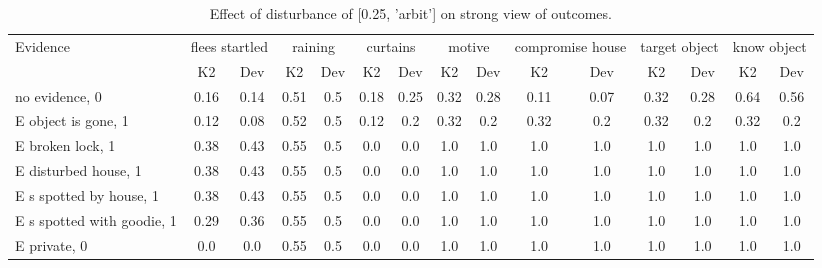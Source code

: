 \begin{table}\begin{tabular}{l|cc|cc|cc|cc|cc|cc|cc}\toprule\multirow{2}{*}{Evidence} & \multicolumn{2}{c}{flees startled}& \multicolumn{2}{c}{raining}& \multicolumn{2}{c}{curtains}& \multicolumn{2}{c}{motive}& \multicolumn{2}{c}{compromise house}& \multicolumn{2}{c}{target object}& \multicolumn{2}{c}{know object}\\& {K2} & {Dev}& {K2} & {Dev}& {K2} & {Dev}& {K2} & {Dev}& {K2} & {Dev}& {K2} & {Dev}& {K2} & {Dev}\\\midrule
no evidence, 0 & 0.16&0.14&0.51&0.5&\cellcolor{Bittersweet}0.18&\cellcolor{Bittersweet}0.25&0.32&0.28&0.11&0.07&0.32&0.28&\cellcolor{Bittersweet}0.64&\cellcolor{Bittersweet}0.56\\E object is gone, 1 & 0.12&0.08&0.52&0.5&\cellcolor{Bittersweet}0.12&\cellcolor{Bittersweet}0.2&\cellcolor{Bittersweet}0.32&\cellcolor{Bittersweet}0.2&\cellcolor{Bittersweet}0.32&\cellcolor{Bittersweet}0.2&\cellcolor{Bittersweet}0.32&\cellcolor{Bittersweet}0.2&\cellcolor{Bittersweet}0.32&\cellcolor{Bittersweet}0.2\\E broken lock, 1 & 0.38&0.43&\cellcolor{Bittersweet}0.55&\cellcolor{Bittersweet}0.5&0.0&0.0&1.0&1.0&1.0&1.0&1.0&1.0&1.0&1.0\\E disturbed house, 1 & 0.38&0.43&\cellcolor{Bittersweet}0.55&\cellcolor{Bittersweet}0.5&0.0&0.0&1.0&1.0&1.0&1.0&1.0&1.0&1.0&1.0\\E s spotted by house, 1 & 0.38&0.43&\cellcolor{Bittersweet}0.55&\cellcolor{Bittersweet}0.5&0.0&0.0&1.0&1.0&1.0&1.0&1.0&1.0&1.0&1.0\\E s spotted with goodie, 1 & \cellcolor{Bittersweet}0.29&\cellcolor{Bittersweet}0.36&\cellcolor{Bittersweet}0.55&\cellcolor{Bittersweet}0.5&0.0&0.0&1.0&1.0&1.0&1.0&1.0&1.0&1.0&1.0\\E private, 0 & 0.0&0.0&\cellcolor{Bittersweet}0.55&\cellcolor{Bittersweet}0.5&0.0&0.0&1.0&1.0&1.0&1.0&1.0&1.0&1.0&1.0\\\bottomrule\end{tabular}\caption{Effect of disturbance of [0.25, 'arbit'] on strong view of outcomes.}\end{table}